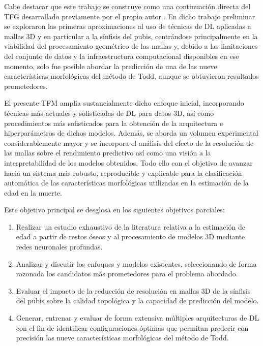 Cabe destacar que este trabajo se construye como una continuación directa del TFG desarrollado previamente por el propio autor \cite{lugli_tfg_2022}. En dicho trabajo preliminar se exploraron las primeras aproximaciones al uso de técnicas de DL aplicadas a mallas 3D y en particular a la sínfisis del pubis, centrándose principalmente en la viabilidad del procesamiento geométrico de las mallas y, debido a las limitaciones del conjunto de datos y la infraestructura computacional disponibles en ese momento, solo fue posible abordar la predicción de una de las nueve características morfológicas del método de Todd, aunque se obtuvieron resultados prometedores.

El presente TFM amplía sustancialmente dicho enfoque inicial, incorporando técnicas más actuales y sofisticadas de DL para datos 3D, así como procedimientos más sofisticados para la obtención de la arquitectura e hiperparámetros de dichos modelos. Además, se aborda un volumen experimental considerablemente mayor y se incorpora el análisis del efecto de la resolución de las mallas sobre el rendimiento predictivo así como una visión a la interpretabilidad de los modelos obtenidos. Todo ello con el objetivo de avanzar hacia un sistema más robusto, reproducible y explicable para la clasificación automática de las características morfológicas utilizadas en la estimación de la edad en la muerte.

Este objetivo principal se desglosa en los siguientes objetivos parciales:

\begin{enumerate}
    \item Realizar un estudio exhaustivo de la literatura relativa a la estimación de edad a partir de restos óseos y al procesamiento de modelos 3D mediante redes neuronales profundas.
    \item Analizar y discutir los enfoques y modelos existentes, seleccionando de forma razonada los candidatos más prometedores para el problema abordado.
    \item Evaluar el impacto de la reducción de resolución en mallas 3D de la sínfisis del pubis sobre la calidad topológica y la capacidad de predicción del modelo.
    \item Generar, entrenar y evaluar de forma extensiva múltiples arquitecturas de DL con el fin de identificar configuraciones óptimas que permitan predecir con precisión las nueve características morfológicas del método de Todd.
\end{enumerate}

